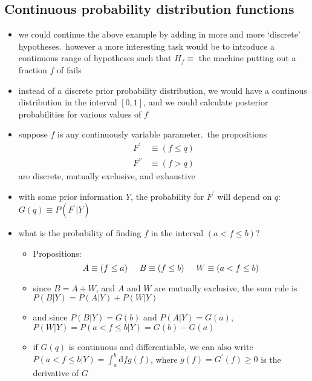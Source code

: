 \documentclass[../jaynes_prob_theory_notes.tex]{subfiles}
\begin{document}
\subsection{Continuous probability distribution functions}
    \begin{itemize}
        \item we could continue the above example by adding in more and more `discrete' hypotheses.\ however a more interesting task would be to introduce a continuous range of hypotheses such that $H_f \equiv$ the machine putting out a fraction $f$ of fails
        \item instead of a discrete prior probability distribution, we would have a continous distribution in the interval $[0,1]$, and we could calculate posterior probabilities for various values of $f$
        \item suppose $f$ is any continuously variable parameter.\ the propositions 
            \begin{align*}
                F^{\prime} &\equiv (f \leq q) \\
                F^{\prime\prime} &\equiv (f > q)
            \end{align*}
        are discrete, mutually exclusive, and exhaustive
        \item with some prior information $Y$, the probability for $F^{\prime}$ will depend on $q$: $G(q) \equiv P(F^{\prime}|Y)$
        \item what is the probability  of finding $f$ in the interval $(a < f \leq b)$?
            \begin{itemize}
                \item Propositions:
                    \begin{equation*}
                        A \equiv (f \leq a) \hspace{0.5cm} B \equiv (f \leq b) \hspace{0.5cm} W \equiv (a < f \leq b)
                    \end{equation*}
                \item since $B = A + W$, and $A$ and $W$ are mutually exclusive, the sum rule is $P(B|Y) = P(A|Y) + P(W|Y)$
                \item and since $P(B|Y) = G(b)$ and $P(A|Y) = G(a)$, $P(W|Y) = P(a < f \leq b|Y) = G(b) - G(a)$
                \item if $G(q)$ is continuous and differentiable, we can also write $P(a < f \leq b|Y) = \int^b_{a} \mathrm{d}fg(f)$, where $g(f) = G^{\prime}(f) \geq 0$ is the derivative of $G$

\end{itemize}
\end{itemize}
\end{document}
